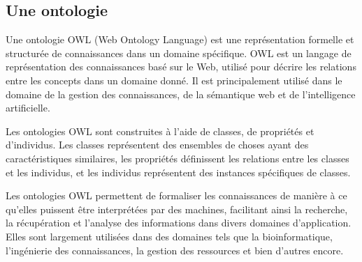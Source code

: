 \documentclass{article}
\begin{document}
	
	\subsection{Une ontologie}
	\quad Une ontologie OWL (Web Ontology Language) est une représentation formelle et structurée de connaissances dans un domaine spécifique. OWL est un langage de représentation des connaissances basé sur le Web, utilisé pour décrire les relations entre les concepts dans un domaine donné. Il est principalement utilisé dans le domaine de la gestion des connaissances, de la sémantique web et de l'intelligence artificielle.
	
	Les ontologies OWL sont construites à l'aide de classes, de propriétés et d'individus. Les classes représentent des ensembles de choses ayant des caractéristiques similaires, les propriétés définissent les relations entre les classes et les individus, et les individus représentent des instances spécifiques de classes.
	
	Les ontologies OWL permettent de formaliser les connaissances de manière à ce qu'elles puissent être interprétées par des machines, facilitant ainsi la recherche, la récupération et l'analyse des informations dans divers domaines d'application. Elles sont largement utilisées dans des domaines tels que la bioinformatique, l'ingénierie des connaissances, la gestion des ressources et bien d'autres encore.
	
\end{document}

